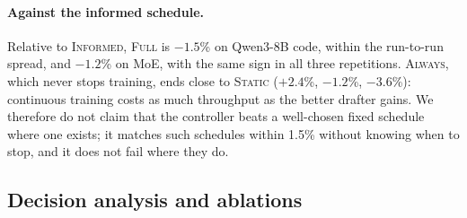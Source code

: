 \documentclass{article}
\newcommand{\pol}[1]{\textsc{#1}}
\begin{document}
\paragraph{Against the informed schedule.} Relative to \pol{Informed}, \pol{Full} is $-1.5$\% on Qwen3-8B code, within the run-to-run spread, and $-1.2$\% on MoE, with the same sign in all three repetitions. \pol{Always}, which never stops training, ends close to \pol{Static} ($+2.4$\%, $-1.2$\%, $-3.6$\%): continuous training costs as much throughput as the better drafter gains. We therefore do not claim that the controller beats a well-chosen fixed schedule where one exists; it matches such schedules within 1.5\% without knowing when to stop, and it does not fail where they do.

\subsection{Decision analysis and ablations}\label{sec:levers}
\end{document}

